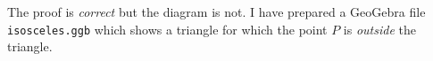 \documentclass[11pt,a4paper]{article}
\begin{document}
The proof is \emph{correct} but the diagram is not. I have prepared a GeoGebra file \texttt{isosceles.ggb} which shows a triangle for which the point $P$ is \emph{outside} the triangle.



\newpage



\end{document}
